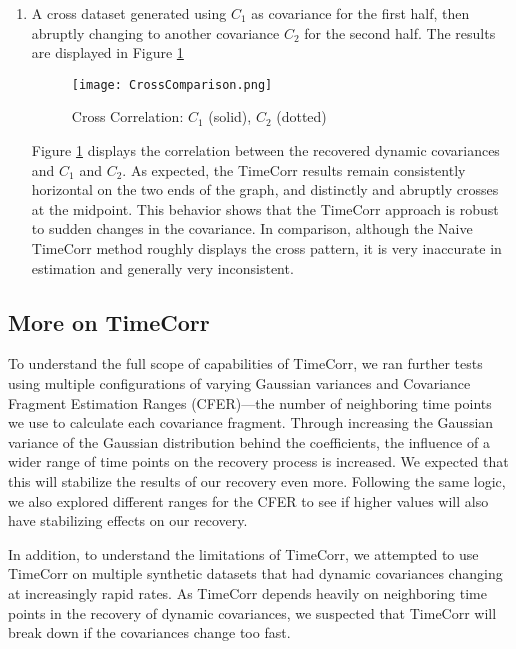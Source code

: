 \documentclass[12pt]{article}
\begin{document}
\begin{enumerate}
\item A cross dataset generated using $C_1$ as covariance for the first half, then abruptly changing to another covariance $C_2$ for the second half. The results are displayed in Figure \ref{fig:cross}\par
\begin{figure}[h]
\caption{Cross Correlation: $C_1$ (solid), $C_2$ (dotted)}
\centering
\texttt{[image: CrossComparison.png]}
\label{fig:cross}
\end{figure}
Figure \ref{fig:cross} displays the correlation between the recovered dynamic covariances and $C_1$ and $C_2$. As expected, the TimeCorr results remain consistently horizontal on the two ends of the graph, and distinctly and abruptly crosses at the midpoint. This behavior shows that the TimeCorr approach is robust to sudden changes in the covariance. In comparison, although the Naive TimeCorr method roughly displays the cross pattern, it is very inaccurate in estimation and generally very inconsistent.\par
\end{enumerate}

\subsection{More on TimeCorr}
To understand the full scope of capabilities of TimeCorr, we ran further tests using multiple configurations of varying Gaussian variances and Covariance Fragment Estimation Ranges (CFER)---the number of neighboring time points we use to calculate each covariance fragment. Through increasing the Gaussian variance of the Gaussian distribution behind the coefficients, the influence of a wider range of time points on the recovery process is increased. We expected that this will stabilize the results of our recovery even more. Following the same logic, we also explored different ranges for the CFER to see if higher values will also have stabilizing effects on our recovery.\par
In addition, to understand the limitations of TimeCorr, we attempted to use TimeCorr on multiple synthetic datasets that had dynamic covariances changing at increasingly rapid rates. As TimeCorr depends heavily on neighboring time points in the recovery of dynamic covariances, we suspected that TimeCorr will break down if the covariances change too fast.\par
\end{document}
